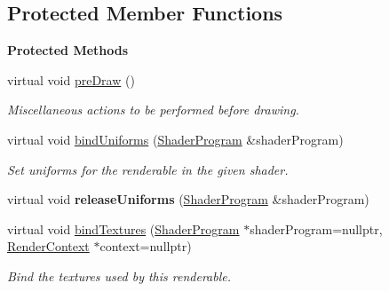 \subsection*{Protected Member Functions}
\begin{Indent}\textbf{ Protected Methods}\par
\begin{DoxyCompactItemize}
\item 
virtual void \mbox{\hyperlink{classrev_1_1_renderable_ac1fe33dec408d65bbae10e24fbedc6bc}{pre\+Draw}} ()
\begin{DoxyCompactList}\small\item\em Miscellaneous actions to be performed before drawing. \end{DoxyCompactList}\item 
\mbox{\label{classrev_1_1_renderable_abb193adc67d748cdc82c92084d13589b}} 
virtual void \mbox{\hyperlink{classrev_1_1_renderable_abb193adc67d748cdc82c92084d13589b}{bind\+Uniforms}} (\mbox{\hyperlink{classrev_1_1_shader_program}{Shader\+Program}} \&shader\+Program)
\begin{DoxyCompactList}\small\item\em Set uniforms for the renderable in the given shader. \end{DoxyCompactList}\item 
\mbox{\label{classrev_1_1_renderable_af53565ffc3740a6da4d6ab4b35f49a98}} 
virtual void {\bfseries release\+Uniforms} (\mbox{\hyperlink{classrev_1_1_shader_program}{Shader\+Program}} \&shader\+Program)
\item 
\mbox{\label{classrev_1_1_renderable_a560bb5898b2961ca72ad9e9ed0e30ced}} 
virtual void \mbox{\hyperlink{classrev_1_1_renderable_a560bb5898b2961ca72ad9e9ed0e30ced}{bind\+Textures}} (\mbox{\hyperlink{classrev_1_1_shader_program}{Shader\+Program}} $\ast$shader\+Program=nullptr, \mbox{\hyperlink{classrev_1_1_render_context}{Render\+Context}} $\ast$context=nullptr)
\begin{DoxyCompactList}\small\item\em Bind the textures used by this renderable. \end{DoxyCompactList}\item 
\mbox{\label{classrev_1_1_renderable_aa1b81e9f1e89909f7a7c5e7122d031d9}} 

\end{DoxyCompactItemize}
\end{Indent}
